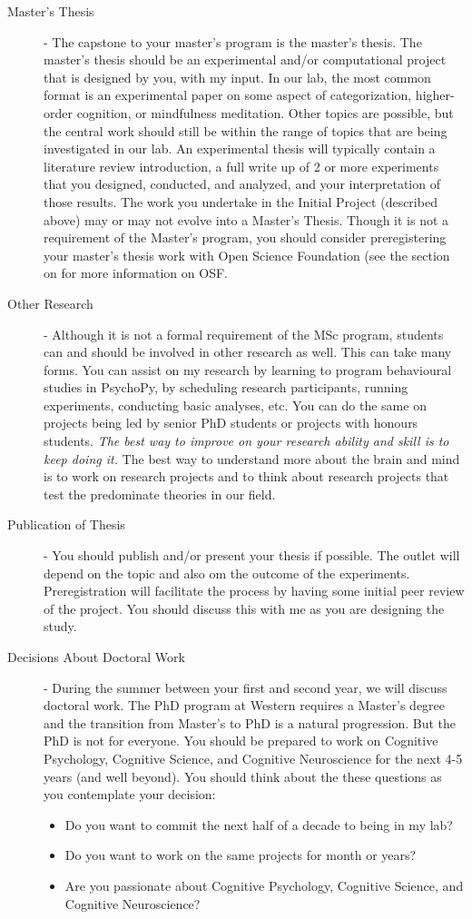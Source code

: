 \documentclass{article}
\begin{document}
\begin{description}
\item [Master's Thesis] - The capstone to your master's program is the master's thesis. The master's thesis should be an experimental and/or computational project that is designed by you, with my input. In our lab, the most common format is an experimental paper on some aspect of categorization, higher-order cognition, or mindfulness meditation. Other topics are possible, but the central work should still be within the range of topics that are being investigated in our lab. An experimental thesis will typically contain a literature review introduction, a full write up of 2 or more experiments that you designed, conducted, and analyzed, and your interpretation of those results. The work you undertake in the Initial Project (described above) may or may not evolve into a Master's Thesis. Though it is not a requirement of the Master's program, you should consider preregistering your master's thesis work with Open Science Foundation (see the section on  for more information on OSF.

\item [Other Research] - Although it is not a formal requirement of the MSc program, students can and should be involved in other research as well. This can take many forms. You can assist on my research by learning to program behavioural studies in PsychoPy, by scheduling research participants, running experiments, conducting basic analyses, etc. You can do the same on projects being led by senior PhD students or projects with honours students. \textit{The best way to improve on your research ability and skill is to keep doing it.} The best way to understand more about the brain and mind is to work on research projects and to think about research projects that test the predominate theories in our field. 

\item [Publication of Thesis] - You should publish and/or present your thesis if possible. The outlet will depend on the topic and also om the outcome of the experiments. Preregistration will facilitate the process by having some initial peer review of the project. You should discuss this with me as you are designing the study.

\item [Decisions About Doctoral Work] - During the summer between your first and second year, we will discuss doctoral work. The PhD program at Western requires a Master's degree and the transition from Master's to PhD is a natural progression. But the PhD is not for everyone. You should be prepared to work on Cognitive Psychology, Cognitive Science, and Cognitive Neuroscience for the next 4-5 years (and well beyond). You should think about the these questions as you contemplate your decision: 
\begin{itemize}
\item Do you want to commit the next half of a decade to being in my lab? 
\item Do you want to work on the same projects for month or years? 
\item Are you passionate about Cognitive Psychology, Cognitive Science, and Cognitive Neuroscience? 
\end{itemize}


\end{description}
\end{document}
